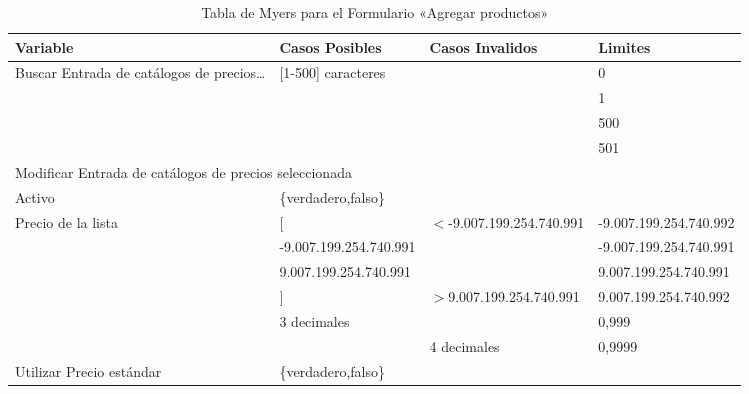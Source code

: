 \begin{table}
\centering
\begin{tabular}{|p{3.0cm}|p{4.0cm}|p{4.0cm}|l|}
\hline
\footnotesize{\textbf{Variable}} & \footnotesize{\textbf{Casos Posibles}} & \footnotesize{\textbf{Casos Invalidos}} & \footnotesize{\textbf{Limites}} \\
\hline
\footnotesize{Buscar Entrada de catálogos de precios\ldots} & \footnotesize{[1-500] caracteres} & & \footnotesize{0} \\
& & & \footnotesize{1} \\
& & & \footnotesize{500} \\
& & & \footnotesize{501} \\
\hline
\multicolumn{4}{|l|}{\footnotesize{Modificar Entrada de catálogos de precios seleccionada}} \\
\hline
\footnotesize{Activo} & \footnotesize{\{verdadero,falso\}} & & \\
\hline
\footnotesize{Precio de la lista} & \footnotesize{[} & \footnotesize{$<$-9.007.199.254.740.991} & \footnotesize{-9.007.199.254.740.992} \\
& \footnotesize{-9.007.199.254.740.991} & & \footnotesize{-9.007.199.254.740.991} \\
& \footnotesize{9.007.199.254.740.991} & & \footnotesize{9.007.199.254.740.991} \\
& \footnotesize{]} & \footnotesize{$>$9.007.199.254.740.991} & \footnotesize{9.007.199.254.740.992} \\
& \footnotesize{3 decimales} & & \footnotesize{0,999} \\
& & \footnotesize{4 decimales} & \footnotesize{0,9999} \\
\hline
\footnotesize{Utilizar Precio estándar} & \footnotesize{\{verdadero,falso\}} & & \\
\hline
\end{tabular}
\caption{Tabla de Myers para el Formulario «Agregar productos»}
\label{myers_06}
\end{table}

